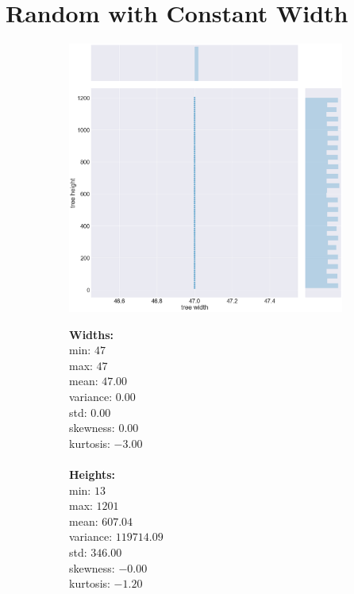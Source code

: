 \section{Random with Constant Width}
\label{appendix:data:randconstwidth}
\begin{figure}[H]
\centering
\begin{subfigure}{.8\textwidth}
	\includegraphics[width=.9\textwidth]{img/3_RANDCONSTWIDTH_plot.png}
\end{subfigure}%
\begin{subfigure}{.2\textwidth}
  \centering
  \begin{minipage}{1\textwidth}
\textbf{Widths:}
\\
min: $47$
\\
max: $47$
\\
mean: $47.00$
\\
variance: $0.00$
\\
std: $0.00$
\\
skewness: $0.00$
\\
kurtosis: $-3.00$
\\\\
\textbf{Heights:}
\\
min: $13$
\\
max: $1201$
\\
mean: $607.04$
\\
variance: $119714.09$
\\
std: $346.00$
\\
skewness: $-0.00$
\\
kurtosis: $-1.20$
  \end{minipage}
\end{subfigure}
\end{figure}
